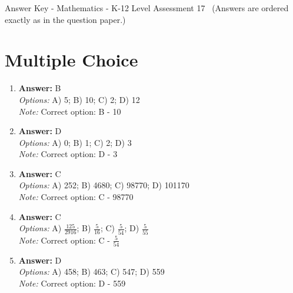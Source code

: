 \documentclass[12pt]{article}
\begin{document}
\begin{center}
Answer Key - Mathematics - K-12 Level Assessment 17 \
\small (Answers are ordered exactly as in the question paper.)
\end{center}

\section*{Multiple Choice}
\begin{enumerate}[label=\arabic*.]
\item \textbf{Answer:} B
\\ \textit{Options:} A) 5; B) 10; C) 2; D) 12
\\ \textit{Note:} Correct option: B - 10
\item \textbf{Answer:} D
\\ \textit{Options:} A) 0; B) 1; C) 2; D) 3
\\ \textit{Note:} Correct option: D - 3
\item \textbf{Answer:} C
\\ \textit{Options:} A) 252; B) 4680; C) 98770; D) 101170
\\ \textit{Note:} Correct option: C - 98770
\item \textbf{Answer:} C
\\ \textit{Options:} A) \ensuremath{\frac{125}{2916}}; B) \ensuremath{\frac{5}{16}}; C) \ensuremath{\frac{5}{54}}; D) \ensuremath{\frac{5}{55}}
\\ \textit{Note:} Correct option: C - \ensuremath{\frac{5}{54}}
\item \textbf{Answer:} D
\\ \textit{Options:} A) 458; B) 463; C) 547; D) 559
\\ \textit{Note:} Correct option: D - 559
\end{enumerate}
\end{document}
